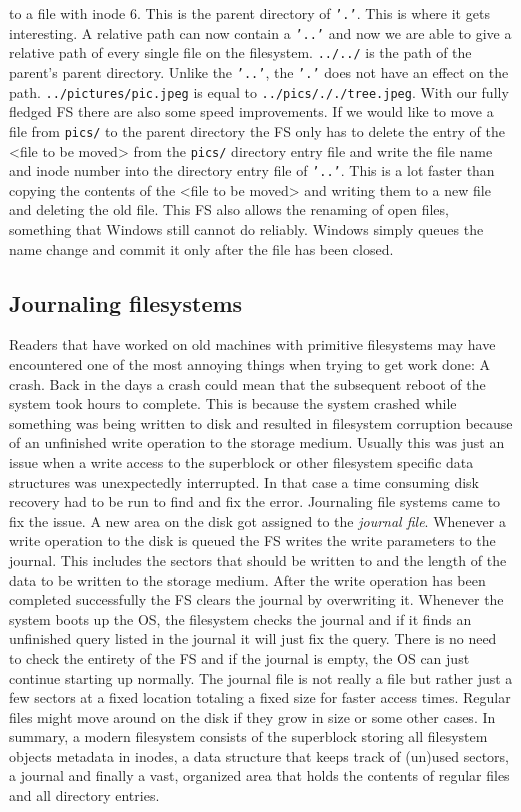 to a file with inode 6. This is the parent directory of \texttt{'.'}. This is where it gets interesting. A
relative path can now contain a \texttt{'..'} and now we are able to give a relative path of every single file
on the filesystem. \texttt{../../} is the path of the parent's parent directory. Unlike the \texttt{'..'}, the \texttt{'.'}
does not have an effect on the path. \texttt{../pictures/pic.jpeg} is equal to \texttt{../pics/././tree.jpeg}.
With our fully fledged FS there are also some speed improvements. If we would like to move a 
file from \texttt{pics/} to the parent directory the FS only has to delete the entry of the <file to be moved> 
from the \texttt{pics/} directory entry file and write the file name and inode number into the directory 
entry file of \texttt{'..'}. This is a lot faster than copying the contents of the <file to be moved> and
writing them to a new file and deleting the old file. This FS also allows the renaming of open 
files, something that Windows still cannot do reliably. Windows simply queues the name change and commit 
it only after the file has been closed.

\subsection{Journaling filesystems}

Readers that have worked on old machines with primitive filesystems may have encountered one of the
most annoying things when trying to get work done: A crash. Back in the days a crash could mean that
the subsequent reboot of the system took hours to complete. This is because the system crashed while
something was being written to disk and resulted in filesystem corruption because of an unfinished
write operation to the storage medium. Usually this was just an issue when a write access to the
superblock or other filesystem specific data structures was unexpectedly interrupted. In that case a
time consuming disk recovery had to be run to find and fix the error. Journaling file systems came to
fix the issue. A new area on the disk got assigned to the \textit{journal file}. Whenever a write operation
to the disk is queued the FS writes the write parameters to the journal. This includes the sectors
that should be written to and the length of the data to be written to the storage medium. After the
write operation has been completed successfully the FS clears the journal by overwriting it. Whenever
the system boots up the OS, the filesystem checks the journal and if it finds an
unfinished query listed in the journal it will just fix the query. There is no need to check the
entirety of the FS and if the journal is empty, the OS can just continue starting up normally.
The journal file is not really a file but rather just a few sectors at a fixed location totaling a
fixed size for faster access times. Regular files might move around on the disk if they grow in size
or some other cases. In summary, a modern filesystem consists of the superblock storing all
filesystem objects metadata in inodes, a data structure that keeps track of (un)used sectors, a journal and
finally a vast, organized area that holds the contents of regular files and all directory entries.
